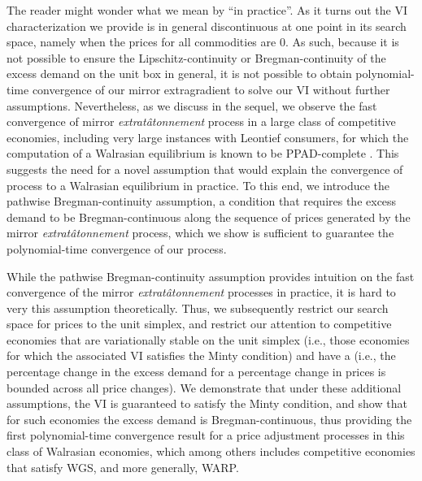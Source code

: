 The reader might wonder what we mean by ``in practice''. As it turns out the VI characterization we provide is in general discontinuous at one point in its search space, namely when the prices for all commodities are $0$. As such, because it is not possible to ensure the Lipschitz-continuity or Bregman-continuity of the excess demand on the unit box in general, it is not possible to obtain polynomial-time convergence of our mirror extragradient to solve our VI without further assumptions. Nevertheless, as we discuss in the sequel, we observe the fast convergence of mirror \emph{extrat\^atonnement} process in a large class of competitive economies, including very large instances with Leontief consumers, for which the computation of a Walrasian equilibrium is known to be PPAD-complete \cite{codenotti2006leontief, deng2008computation}. This suggests the need for a novel assumption that would explain the convergence of process to a Walrasian equilibrium in practice. To this end, we introduce the pathwise Bregman-continuity assumption, a condition that requires the excess demand to be Bregman-continuous along the sequence of prices generated by the mirror \emph{extrat\^atonnement} process, which we show is sufficient to guarantee the polynomial-time convergence of our process.


While the pathwise Bregman-continuity assumption provides intuition on the fast convergence of the mirror \emph{extrat\^atonnement} processes in practice, it is hard to very this assumption theoretically.  Thus, we subsequently restrict our search space for prices to the unit simplex, and restrict our attention to competitive economies that are variationally stable on the unit simplex (i.e., those economies for which the associated VI satisfies the Minty condition) and have a  (i.e., the percentage change in the excess demand for a percentage change in prices is bounded across all price changes). We demonstrate that under these additional assumptions, the VI is guaranteed to satisfy the Minty condition, and show that for such economies the excess demand is Bregman-continuous, thus providing the first polynomial-time convergence result for a price adjustment processes in this class of Walrasian economies, which among others includes competitive economies that satisfy WGS, and more generally, WARP. 






